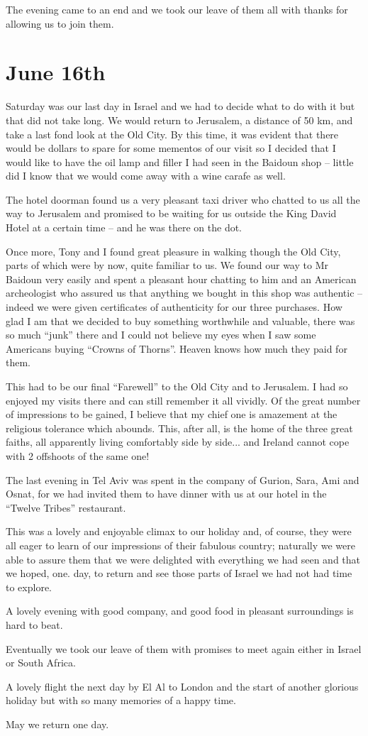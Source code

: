 The evening came to an end and we took our leave of them all with
thanks for allowing us to join them.


\section{June 16th}

Saturday was our last day in Israel and we had to decide what to do
with it but that did not take long. We would return to Jerusalem, a
distance of 50 km, and take a last fond look at the Old City. By this
time, it was evident that there would be dollars to spare for some
mementos of our visit so I decided that I would like to have the oil
lamp and filler I had seen in the Baidoun shop -- little did I know
that we would come away with a wine carafe as well.

The hotel doorman found us a very pleasant taxi driver who chatted to
us all the way to Jerusalem and promised to be waiting for us outside
the King David Hotel at a certain time -- and he was there on the dot.

Once more, Tony and I found great pleasure in walking though the Old
City, parts of which were by now, quite familiar to us. We found our
way to Mr Baidoun very easily and spent a pleasant hour chatting to
him and an American archeologist who assured us that anything we
bought in this shop was authentic -- indeed we were given certificates
of authenticity for our three purchases. How glad I am that we decided
to buy something worthwhile and valuable, there was so much ``junk''
there and I could not believe my eyes when I saw some Americans buying
``Crowns of Thorns''. Heaven knows how much they paid for them.

This had to be our final ``Farewell'' to the Old City and to
Jerusalem. I had so enjoyed my visits there and can still remember it
all vividly. Of the great number of impressions to be gained, I
believe that my chief one is amazement at the religious tolerance
which abounds. This, after all, is the home of the three great faiths,
all apparently living comfortably side by side... and Ireland cannot
cope with 2 offshoots of the same one!

The last evening in Tel Aviv was spent in the company of Gurion, Sara,
Ami and Osnat, for we had invited them to have dinner with us at our
hotel in the ``Twelve Tribes'' restaurant.

This was a lovely and enjoyable climax to our holiday and, of course,
they were all eager to learn of our impressions of their fabulous
country; naturally we were able to assure them that we were delighted
with everything we had seen and that we hoped, one. day, to return and
see those parts of Israel we had not had time to explore.

A lovely evening with good company, and good food in pleasant
surroundings is hard to beat.

Eventually we took our leave of them with promises to meet again
either in Israel or South Africa.

A lovely flight the next day by El Al to London and the start of
another glorious holiday but with so many memories of a happy time.

May we return one day.

